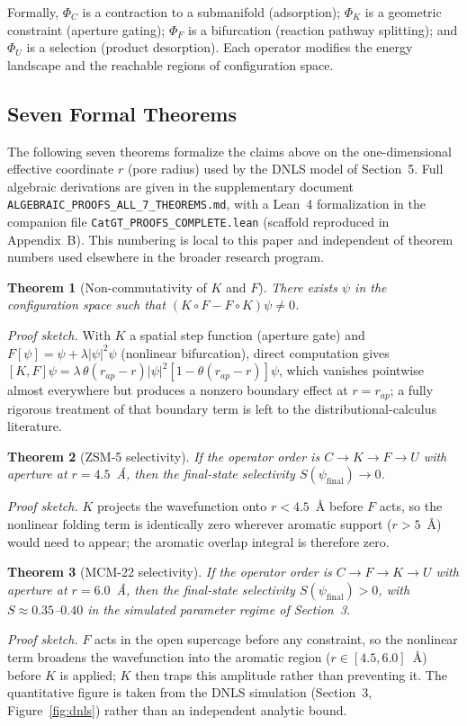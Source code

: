 \documentclass[11pt]{article}
\newtheorem{theorem}{Theorem}
\begin{document}
Formally, $\Phi_C$ is a contraction to a submanifold (adsorption); $\Phi_K$ is a geometric constraint (aperture gating); $\Phi_F$ is a bifurcation (reaction pathway splitting); and $\Phi_U$ is a selection (product desorption). Each operator modifies the energy landscape and the reachable regions of configuration space.

\subsection{Seven Formal Theorems}
\label{sec:theorems}

The following seven theorems formalize the claims above on the one-dimensional effective coordinate $r$ (pore radius) used by the DNLS model of Section~5. Full algebraic derivations are given in the supplementary document \texttt{ALGEBRAIC\_PROOFS\_ALL\_7\_THEOREMS.md}, with a Lean~4 formalization in the companion file \texttt{CatGT\_PROOFS\_COMPLETE.lean} (scaffold reproduced in Appendix~B). This numbering is local to this paper and independent of theorem numbers used elsewhere in the broader research program.

\begin{theorem}[Non-commutativity of $K$ and $F$]
There exists $\psi$ in the configuration space such that $(K \circ F - F \circ K)\psi \neq 0$.
\end{theorem}
\emph{Proof sketch.} With $K$ a spatial step function (aperture gate) and $F[\psi] = \psi + \lambda|\psi|^2\psi$ (nonlinear bifurcation), direct computation gives $[K,F]\psi = \lambda\,\theta(r_{ap}-r)|\psi|^2[1-\theta(r_{ap}-r)]\psi$, which vanishes pointwise almost everywhere but produces a nonzero boundary effect at $r=r_{ap}$; a fully rigorous treatment of that boundary term is left to the distributional-calculus literature.

\begin{theorem}[ZSM-5 selectivity]
If the operator order is $C \to K \to F \to U$ with aperture at $r=4.5$~\AA, then the final-state selectivity $S(\psi_{\mathrm{final}}) \to 0$.
\end{theorem}
\emph{Proof sketch.} $K$ projects the wavefunction onto $r<4.5$~\AA{} before $F$ acts, so the nonlinear folding term is identically zero wherever aromatic support ($r>5$~\AA) would need to appear; the aromatic overlap integral is therefore zero.

\begin{theorem}[MCM-22 selectivity]
If the operator order is $C \to F \to K \to U$ with aperture at $r=6.0$~\AA, then the final-state selectivity $S(\psi_{\mathrm{final}}) > 0$, with $S \approx 0.35$--$0.40$ in the simulated parameter regime of Section~3.
\end{theorem}
\emph{Proof sketch.} $F$ acts in the open supercage before any constraint, so the nonlinear term broadens the wavefunction into the aromatic region ($r\in[4.5,6.0]$~\AA) before $K$ is applied; $K$ then traps this amplitude rather than preventing it. The quantitative figure is taken from the DNLS simulation (Section~3, Figure~\ref{fig:dnls}) rather than an independent analytic bound.
\end{document}
